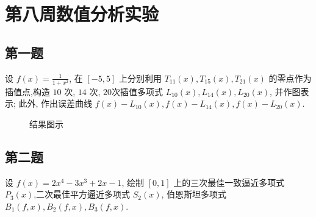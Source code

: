 \section{第八周数值分析实验}
\subsection{第一题}
\begin{ex}
	设 $f(x)=\frac{1}{1+x^2}$, 在 $[-5,5]$ 上分别利用 $T_{11}(x), T_{15}(x), T_{21}(x)$ 的零点作为插值点,构造 $10$ 次, $14$ 次, $20 $次插值多项式 $L_{10}(x), L_{14}(x), L_{20}(x)$, 并作图表示; 此外, 作出误差曲线 $f(x)-L_{10}(x), f(x)-L_{14}(x), f(x)-L_{20}(x)$.
\end{ex}

\begin{figure}[H]
	\centering
	\hfill
	\caption{结果图示}
\end{figure}
\subsection{第二题}
\begin{ex}
	设 $f(x)=2 x^4-3 x^3+2 x-1$, 绘制 $[0,1]$ 上的三次最佳一致逼近多项式 $P_3(x)$,二次最佳平方逼近多项式 $S_2(x)$, 伯恩斯坦多项式 $B_1(f, x), B_2(f, x), B_3(f, x)$.
\end{ex}
